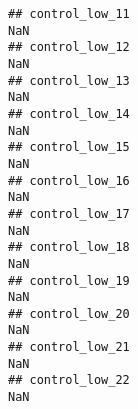 \documentclass[
]{article}
\begin{document}
\begin{verbatim}
## control_low_11                                                                                                                                                                                                                  NaN
## control_low_12                                                                                                                                                                                                                  NaN
## control_low_13                                                                                                                                                                                                                  NaN
## control_low_14                                                                                                                                                                                                                  NaN
## control_low_15                                                                                                                                                                                                                  NaN
## control_low_16                                                                                                                                                                                                                  NaN
## control_low_17                                                                                                                                                                                                                  NaN
## control_low_18                                                                                                                                                                                                                  NaN
## control_low_19                                                                                                                                                                                                                  NaN
## control_low_20                                                                                                                                                                                                                  NaN
## control_low_21                                                                                                                                                                                                                  NaN
## control_low_22                                                                                                                                                                                                                  NaN

\end{verbatim}
\end{document}
